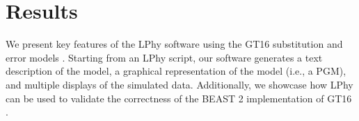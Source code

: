 \documentclass[10pt,letterpaper,table]{article}
\begin{document}


\section{Results}
We present key features of the LPhy software using the GT16 substitution and error models \cite{kozlov2022cellphy}. 
Starting from an LPhy script, our software generates a text description of the model, a graphical representation of the model (i.e., a PGM), and multiple displays of the simulated data. 
Additionally, we showcase how LPhy can be used to validate the correctness of the BEAST 2 implementation of GT16 \cite{chen2022accounting}. 

\end{document}
